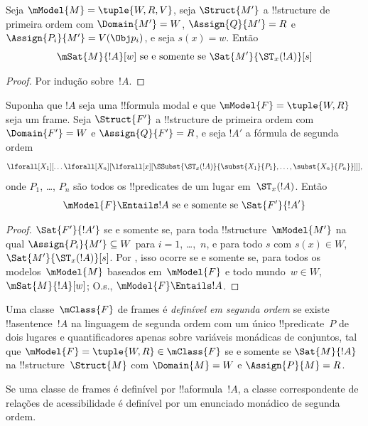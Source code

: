 \documentclass[../../../include/open-logic-section]{subfiles}
\begin{document}
\begin{prop}
  Seja $\mModel{M} = \tuple{W, R, V}$, seja $\Struct{M'}$ a !!{structure} de
  primeira ordem com $\Domain{M'} = W$, $\Assign{Q}{M'} = R$ e
  $\Assign{P_i}{M'} = V(\Obj p_i)$, e seja $s(x) = w$. Então
  \[
  \mSat{M}{!A}[w] \text{ se e somente se } \Sat{M'}{\ST_x(!A)}[s]
  \]
\end{prop}

\begin{proof}
  Por indução sobre~$!A$.
\end{proof}

\begin{prop}
  Suponha que $!A$ seja uma !!{formula} modal e que
  $\mModel{F} = \tuple{W, R}$ seja um frame. Seja $\Struct{F'}$ a
  !!{structure} de primeira ordem com $\Domain{F'} = W$ e
  $\Assign{Q}{F'} = R$, e seja $!A'$ a fórmula de segunda ordem
  \[
  \lforall[X_1][\dots\lforall[X_n][\lforall[x][
        \SSubst{\ST_x(!A)}{\subst{X_1}{P_1}, \dots,
          \subst{X_n}{P_n}}]]],
  \]
  onde $P_1$, \dots, $P_n$ são todos os !!{predicate}s de um lugar
  em~$\ST_x(!A)$. Então
  \[
  \mModel{F} \Entails !A \text{ se e somente se } \Sat{F'}{!A'}
  \]
\end{prop}

\begin{proof}
  $\Sat{F'}{!A'}$ se e somente se, para toda !!{structure}~$\mModel{M'}$ na
  qual $\Assign{P_i}{M'} \subseteq W$ para $i = 1$, \dots,~$n$, e para todo
  $s$ com $s(x) \in W$, $\Sat{M'}{\ST_x(!A)}[s]$. Por , isso
  ocorre se e somente se, para todos os modelos~$\mModel{M}$ baseados
  em~$\mModel{F}$ e todo mundo~$w \in W$, $\mSat{M}{!A}[w]$; O.s.\@,
  $\mModel{F} \Entails !A$.
\end{proof}

\begin{defn}
  Uma classe~$\mClass{F}$ de frames é \emph{definível em segunda ordem} se
  existe !!a{sentence}~$!A$ na linguagem de segunda ordem com um único
  !!{predicate}~$P$ de dois lugares e quantificadores apenas sobre variáveis
  monádicas de conjuntos, tal que
  $\mModel{F} = \tuple{W, R} \in \mClass{F}$ se e somente se $\Sat{M}{!A}$
  na !!{structure}~$\Struct{M}$ com $\Domain{M} = W$ e
  $\Assign{P}{M} = R$.
\end{defn}

\begin{cor}
  Se uma classe de frames é definível por !!a{formula}~$!A$, a classe
  correspondente de relações de acessibilidade é definível por um enunciado
  monádico de segunda ordem.
\end{cor}
\end{document}
